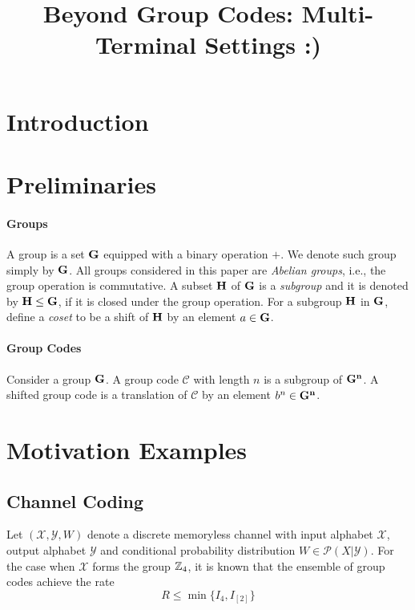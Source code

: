 \documentclass[11pt]{article}
\theoremstyle{plain}
\theoremstyle{definition}
\theoremstyle{remark}
\begin{document}
\title{Beyond Group Codes: Multi-Terminal Settings :)}

\maketitle


\section{Introduction}





\section{Preliminaries}

\paragraph{ Groups} 
A group is a set $\bf G$ equipped with a binary operation $+$. We denote such group simply by $\bf G$. All groups considered in this paper are \textit{Abelian groups}, i.e., the group operation is commutative. A subset $\bf H$ of $\bf G$ is a \textit{subgroup} and it is denoted by $\bf H \leq G$, if it is closed under the group operation. For a subgroup $\bf H$ in $\bf G$, define a \textit{coset} to be a shift of $\bf H$ by an element $a\in \bf G$. 


\paragraph{Group Codes}
Consider a group $\bf G$. A group code $\mathcal{C}$ with length $n$ is a subgroup of $\bf G^n$. A shifted group code is a translation of $\mathcal{C}$ by an element $b^n\in \bf G^n$. 




\section{Motivation Examples}


\subsection{Channel Coding}

Let $(\mathcal{X},\mathcal{Y}, W)$ denote a discrete memoryless channel with input alphabet $\mathcal{X}$, output alphabet $\mathcal{Y}$ and conditional probability distribution $W \in \mathcal{P}(X|\mathcal{Y})$. For the case when $\mathcal{X}$ forms the group $\mathbb{Z}_4$, it is known that the ensemble of group codes achieve the rate 
\begin{equation}
R\leq \min \{I_4, I_{[2]}\}
\end{equation}
\end{document}

